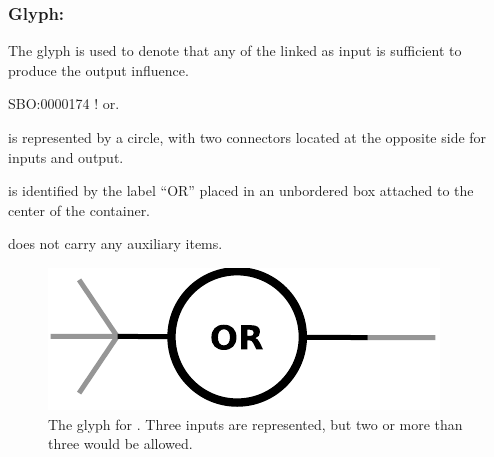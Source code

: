 \color{blue}
\subsubsection{Glyph: }\label{sec:or}

The glyph  is used to denote that any of the  linked as input is sufficient to produce the output influence.

\begin{glyphDescription}

 \glyphSboTerm SBO:0000174 ! or.

 \glyphContainer {} is represented by a circle, with two connectors located at the opposite side for inputs and output.

  \glyphLabel {} is identified by the label ``OR'' placed in an unbordered box attached to the center of the container. 

  \glyphAux {} does not carry any auxiliary items.

\end{glyphDescription}

\begin{figure}[H]
  \centering
  \includegraphics[scale = 0.5]{images/or}
  \caption{The \ER glyph for . Three inputs are represented, but two or more than three would be allowed.}
  \label{fig:or}
\end{figure}


